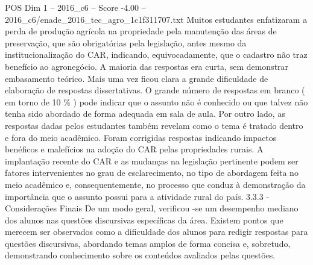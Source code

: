 \begin{textsample}{POS Dim 1 – 2016\_c6 – Score -4.00 – 2016\_c6/enade\_2016\_tec\_agro\_1c1f311707.txt}
Muitos estudantes enfatizaram a perda de produção agrícola na propriedade pela manutenção das áreas de preservação, que são obrigatórias pela legislação, antes mesmo da institucionalização do CAR, indicando, equivocadamente, que o cadastro não traz benefício ao agronegócio.
A maioria das respostas era curta, sem demonstrar embasamento teórico.
Mais uma vez ficou clara a grande dificuldade de elaboração de respostas dissertativas.
O grande número de respostas em branco ( em torno de 10 \% ) pode indicar que o assunto não é conhecido ou que talvez não tenha sido abordado de forma adequada em sala de aula.
Por outro lado, as respostas dadas pelos estudantes também revelam como o tema é tratado dentro e fora do meio acadêmico.
Foram corrigidas respostas indicando impactos benéficos e malefícios na adoção do CAR pelas propriedades rurais.
A implantação recente do CAR e as mudanças na legislação pertinente podem ser fatores intervenientes no grau de esclarecimento, no tipo de abordagem feita no meio acadêmico e, consequentemente, no processo que conduz à demonstração da importância que o assunto possui para a atividade rural do país. 3.3.3 - Considerações Finais De um modo geral, verificou -se um desempenho mediano dos alunos nas questões discursivas específicas da área.
Existem pontos que merecem ser observados como a dificuldade dos alunos para redigir respostas para questões discursivas, abordando temas amplos de forma concisa e, sobretudo, demonstrando conhecimento sobre os conteúdos avaliados pelas questões.

\end{textsample}
